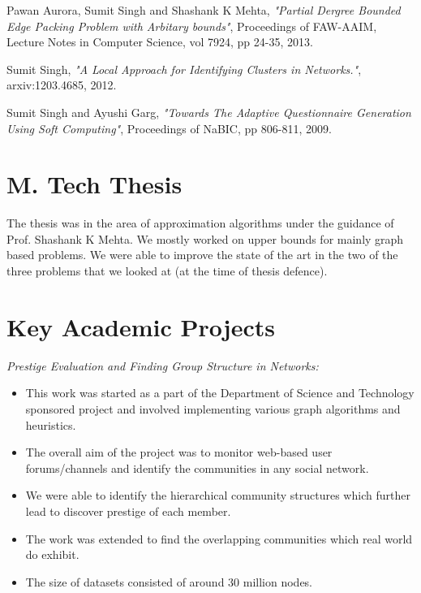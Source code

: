 \documentclass[margin,line]{resume}
\begin{document}
\begin{resume}
\vspace{-2mm}
Pawan Aurora, Sumit Singh and Shashank K Mehta, \textit{"Partial Dergree Bounded Edge Packing Problem with Arbitary bounds"}, Proceedings of FAW-AAIM, Lecture Notes in Computer Science, vol 7924, pp 24-35, 2013. 

\vspace{-2mm}
Sumit Singh, \textit{"A Local Approach for Identifying Clusters in Networks."}, arxiv:1203.4685, 2012.

\vspace{-2mm}
Sumit Singh and Ayushi Garg, \textit{"Towards The Adaptive Questionnaire Generation Using Soft Computing"}, Proceedings of NaBIC, pp 806-811, 2009.



    \section{\mysidestyle M. Tech Thesis}
The thesis was in the area of approximation algorithms under the guidance of Prof. Shashank K Mehta. 
We mostly worked on upper bounds for mainly graph based problems. We were able to improve the state of the art in  the two of the three problems that we looked at (at the time of thesis defence).
   
   

\vspace{8mm}
    \section{\mysidestyle Key Academic Projects}
\renewcommand{\labelitemi}{$\bullet$}
	\textit{Prestige Evaluation and Finding Group Structure in Networks:} 
	\begin{itemize}
	\item
	This work was started as a part of the Department of Science and Technology sponsored project and involved implementing various graph algorithms and heuristics. 
	\item The overall aim of the project was to monitor web-based user forums/channels and identify the communities in any social network. 
	\item We were able to identify the hierarchical community structures which further lead to discover prestige of each member. 
	\item The work was extended to find the overlapping communities which real world do exhibit.
	\item The size of datasets consisted of around 30 million nodes. 
\end{itemize}


\end{resume}
\end{document}
